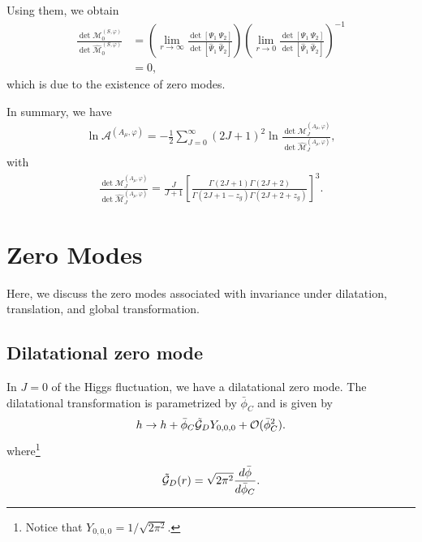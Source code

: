 \documentclass[12pt]{article}
\begin{document}
Using them, we obtain
\begin{align}
 \frac{\det\mathcal M^{(S,\varphi)}_0}{\det\widehat{\mathcal M}^{(S,\varphi)}_0}
  & = \left(
  \lim_{r\to\infty}\frac{\det[\Psi_1~\Psi_2]}{\det[\hat\Psi_1~\hat\Psi_2]}
 \right)
 \left(
  \lim_{r\to0}\frac{\det[\Psi_1~\Psi_2]}{\det[\hat\Psi_1~\hat\Psi_2]}
 \right)^{-1}\nonumber \\
  & = 0,
\end{align}
which is due to the existence of zero modes.

%

In summary, we have
\begin{align}
 \ln\mathcal A^{(A_\mu,\varphi)}
 = -\frac{1}{2}\sum_{J=0}^{\infty}(2J+1)^2
 \ln\frac{\det\mathcal M^{(A_\mu,\varphi)}_J}
 {\det\widehat{\mathcal M}^{(A_\mu,\varphi)}_J},
 \label{eq_gaugeSLT}
\end{align}
with
\begin{align}
 \frac{\det\mathcal M^{(A_\mu,\varphi)}_J}{\det\widehat{\mathcal M}^{(A_\mu,\varphi)}_J}
 = \frac{J}{J+1}
 \left[
  \frac{\Gamma(2J+1)\Gamma(2J+2)}{\Gamma(2J+1-z_g)\Gamma(2J+2+z_g)}
 \right]^3.
\end{align}

\section{Zero Modes}
\label{apx_zeromode}
\setcounter{equation}{0}

Here, we discuss the zero modes associated with invariance under
dilatation, translation, and global transformation.

\subsection{Dilatational zero mode}

In $J = 0$ of the Higgs fluctuation, we have a dilatational zero
mode. The dilatational transformation is parametrized by $\bar\phi_C$
and is given by
\begin{align}
 h\to h+\bar\phi_C\tilde{{\cal G}}_DY_{0,0,0}+\mathcal O(\bar\phi_C^2).
\end{align}
where\footnote{Notice that $Y_{0,0,0} = 1/\sqrt{2\pi^2}$.}
\begin{align}
 \tilde{{\cal G}}_D(r) = \sqrt{2\pi^2}\frac{d\bar\phi}{d\bar\phi_C}.
\end{align}
\end{document}
